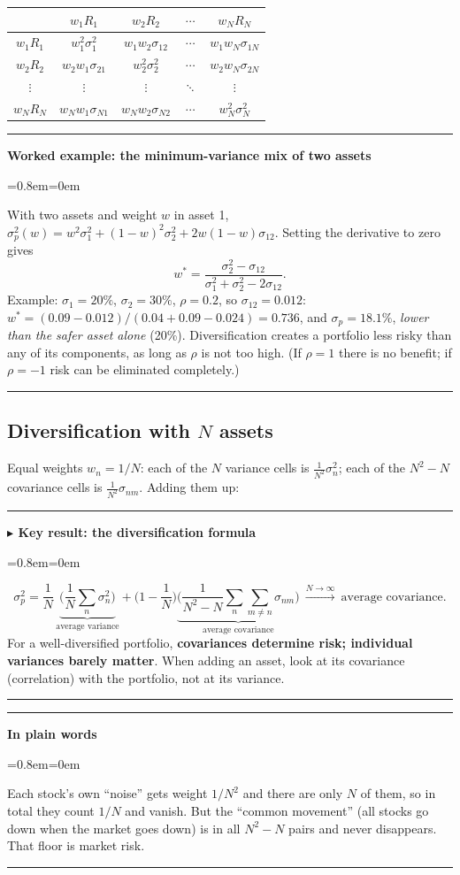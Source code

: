 \documentclass[11pt,a4paper]{report}
\newenvironment{notebox}[1]
  {\par\medskip\Needspace{6\baselineskip}\noindent\rule{\linewidth}{0.4pt}\par\nopagebreak
   \noindent\textbf{#1}\par\nopagebreak
   \begin{list}{}{\leftmargin=0.8em\rightmargin=0em\topsep=2pt}\item[]}
  {\end{list}\nopagebreak\noindent\rule{\linewidth}{0.4pt}\par\medskip}
\newenvironment{keybox}[1][]{\begin{notebox}{$\blacktriangleright$ Key result#1}}{\end{notebox}}
\newenvironment{plainbox}{\begin{notebox}{In plain words}}{\end{notebox}}
\newenvironment{workedex}[1][]{\begin{notebox}{Worked example#1}}{\end{notebox}}
\begin{document}
\begin{center}
\begin{tabular}{c|cccc}
 & $w_1R_1$ & $w_2R_2$ & $\cdots$ & $w_NR_N$\\\hline
$w_1R_1$ & $w_1^2\sigma_1^2$ & $w_1w_2\sigma_{12}$ & $\cdots$ & $w_1w_N\sigma_{1N}$\\
$w_2R_2$ & $w_2w_1\sigma_{21}$ & $w_2^2\sigma_2^2$ & $\cdots$ & $w_2w_N\sigma_{2N}$\\
$\vdots$ & $\vdots$ & $\vdots$ & $\ddots$ & $\vdots$\\
$w_NR_N$ & $w_Nw_1\sigma_{N1}$ & $w_Nw_2\sigma_{N2}$ & $\cdots$ & $w_N^2\sigma_N^2$
\end{tabular}
\end{center}


\begin{workedex}[: the minimum-variance mix of two assets]
With two assets and weight $w$ in asset 1,
$\sigma_p^2(w)=w^2\sigma_1^2+(1-w)^2\sigma_2^2+2w(1-w)\sigma_{12}$. Setting the
derivative to zero gives
\[
w^*=\frac{\sigma_2^2-\sigma_{12}}{\sigma_1^2+\sigma_2^2-2\sigma_{12}} .
\]
Example: $\sigma_1=20\%$, $\sigma_2=30\%$, $\rho=0.2$, so $\sigma_{12}=0.012$:
$w^*=(0.09-0.012)/(0.04+0.09-0.024)=0.736$, and $\sigma_p=18.1\%$, \emph{lower than
the safer asset alone} (20\%). Diversification creates a portfolio less risky
than any of its components, as long as $\rho$ is not too high.
(If $\rho=1$ there is no benefit; if $\rho=-1$ risk can be eliminated completely.)
\end{workedex}
\subsection{Diversification with $N$ assets}
Equal weights $w_n=1/N$: each of the $N$ variance cells is $\frac{1}{N^2}\sigma_n^2$;
each of the $N^2-N$ covariance cells is $\frac1{N^2}\sigma_{nm}$. Adding them up:
\begin{keybox}[: the diversification formula]
\[
\sigma_p^2=\frac1N\,\underbrace{\Big(\frac1N\sum_n\sigma_n^2\Big)}_{\text{average variance}}
+\Big(1-\frac1N\Big)\underbrace{\Big(\frac{1}{N^2-N}\sum_n\sum_{m\ne n}\sigma_{nm}\Big)}_{\text{average covariance}}
\ \xrightarrow{N\to\infty}\ \text{average covariance}.
\]
For a well-diversified portfolio, \textbf{covariances determine risk; individual
variances barely matter}. When adding an asset, look at its covariance
(correlation) with the portfolio, not at its variance.
\end{keybox}
\begin{plainbox}
Each stock's own ``noise'' gets weight $1/N^2$ and there are only $N$ of them, so
in total they count $1/N$ and vanish. But the ``common movement'' (all stocks go
down when the market goes down) is in all $N^2-N$ pairs and never disappears.
That floor is market risk.
\end{plainbox}
\end{document}
